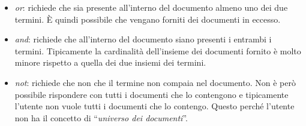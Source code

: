 \begin{itemize}
	\item \textit{or}: richiede che sia presente all'interno del documento almeno uno dei due termini. \`{E} quindi possibile che vengano forniti dei documenti in eccesso.
	\item \textit{and}: richiede che all'interno del documento siano presenti i entrambi i termini. Tipicamente la cardinalità dell'insieme dei documenti fornito è molto minore rispetto a quella dei due insiemi dei termini.
	\item \textit{not}: richiede che non che il termine non compaia nel documento. Non è però possibile rispondere con tutti i documenti che lo contengono e tipicamente l'utente non vuole tutti i documenti che lo contengo. Questo perché l'utente non ha il concetto di ``\textit{universo dei documenti}''.
\end{itemize}























